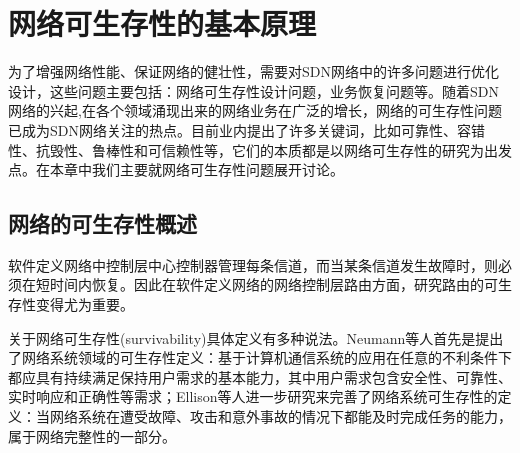 
\chapter{网络可生存性的基本原理}
为了增强网络性能、保证网络的健壮性，需要对SDN网络中的许多问题进行优化设计，这些问题主要包括：网络可生存性设计问题，业务恢复问题等。随着SDN 网络的兴起,在各个领域涌现出来的网络业务在广泛的增长，网络的可生存性问题已成为SDN网络关注的热点。目前业内提出了许多关键词，比如可靠性、容错性、抗毁性、鲁棒性和可信赖性等，它们的本质都是以网络可生存性的研究为出发点。在本章中我们主要就网络可生存性问题展开讨论。



\section{网络的可生存性概述}
软件定义网络中控制层中心控制器管理每条信道，而当某条信道发生故障时，则必须在短时间内恢复。因此在软件定义网络的网络控制层路由方面，研究路由的可生存性变得尤为重要。

关于网络可生存性(survivability)具体定义有多种说法\cite{al2009comparative}。Neumann\cite{hollway1993survivable}等人首先是提出了网络系统领域的可生存性定义：基于计算机通信系统的应用在任意的不利条件下都应具有持续满足保持用户需求的基本能力，其中用户需求包含安全性、可靠性、实时响应和正确性等需求；Ellison\cite{ellison1997survivable}等人进一步研究来完善了网络系统可生存性的定义：当网络系统在遭受故障、攻击和意外事故的情况下都能及时完成任务的能力，属于网络完整性的一部分。






